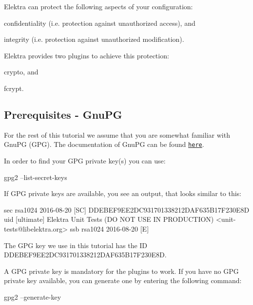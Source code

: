 Elektra can protect the following aspects of your configuration\+:


\begin{DoxyEnumerate}
\item confidentiality (i.\+e. protection against unauthorized access), and
\item integrity (i.\+e. protection against unauthorized modification).
\end{DoxyEnumerate}

Elektra provides two plugins to achieve this protection\+:


\begin{DoxyEnumerate}
\item {\ttfamily crypto}, and
\item {\ttfamily fcrypt}.
\end{DoxyEnumerate}

\subsection*{Prerequisites -\/ Gnu\+PG}

For the rest of this tutorial we assume that you are somewhat familiar with Gnu\+PG (G\+PG). The documentation of Gnu\+PG can be found \href{https://gnupg.org/documentation/index.html}{\tt here}.

In order to find your G\+PG private key(s) you can use\+:


\begin{DoxyCode}
gpg2 --list-secret-keys
\end{DoxyCode}


If G\+PG private keys are available, you see an output, that looks similar to this\+:


\begin{DoxyCode}
sec   rsa1024 2016-08-20 [SC]
          DDEBEF9EE2DC931701338212DAF635B17F230E8D
uid           [ultimate] Elektra Unit Tests (DO NOT USE IN PRODUCTION) <unit-tests@libelektra.org>
ssb   rsa1024 2016-08-20 [E]
\end{DoxyCode}


The G\+PG key we use in this tutorial has the ID {\ttfamily D\+D\+E\+B\+E\+F9\+E\+E2\+D\+C931701338212\+D\+A\+F635\+B17\+F230\+E8D}.

A G\+PG private key is mandatory for the plugins to work. If you have no G\+PG private key available, you can generate one by entering the following command\+:


\begin{DoxyCode}
gpg2 --generate-key
\end{DoxyCode}



